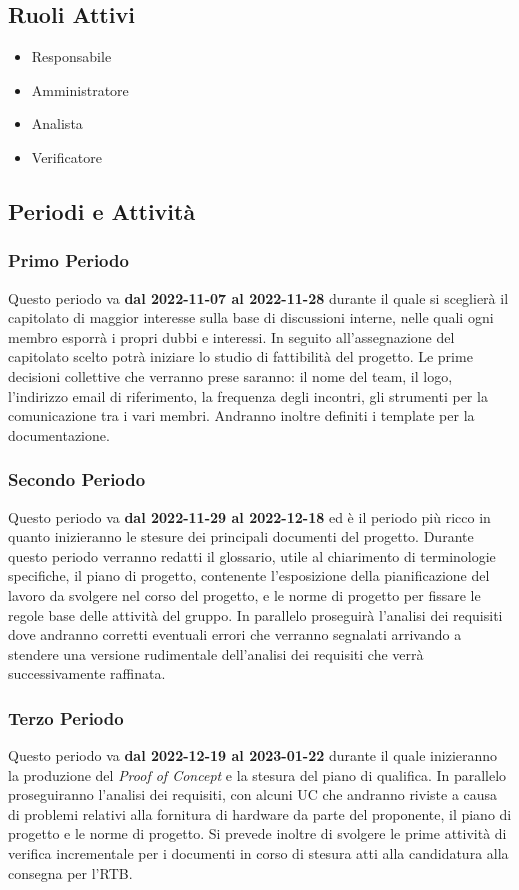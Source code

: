 \subsection{Ruoli Attivi}
\begin{itemize}
    \item Responsabile
    \item Amministratore
    \item Analista
    \item Verificatore
\end{itemize}

\subsection{Periodi e Attività}

\subsubsection{Primo Periodo}
Questo periodo va \textbf{dal 2022-11-07 al 2022-11-28} durante il quale si sceglierà il capitolato di maggior interesse sulla base di discussioni interne, nelle quali ogni membro esporrà i propri dubbi e interessi. In seguito all'assegnazione del capitolato scelto potrà iniziare lo studio di fattibilità del progetto. 
Le prime decisioni collettive che verranno prese saranno: il nome del team, il logo, l’indirizzo email di riferimento, la frequenza degli incontri, gli strumenti per la comunicazione tra i vari membri.
Andranno inoltre definiti i template per la documentazione.

\subsubsection{Secondo Periodo}
Questo periodo va \textbf{dal 2022-11-29 al 2022-12-18} ed è il periodo più ricco in quanto inizieranno le stesure dei principali documenti del progetto. Durante questo periodo verranno redatti il glossario, utile al chiarimento di terminologie specifiche, il piano di progetto, contenente l’esposizione della pianificazione del lavoro da svolgere nel corso del progetto, e le norme di progetto per fissare le regole base delle attività del gruppo. 
In parallelo proseguirà l'analisi dei requisiti dove andranno corretti eventuali errori che verranno segnalati arrivando a stendere una versione rudimentale dell'analisi dei requisiti che verrà successivamente raffinata.

\subsubsection{Terzo Periodo}
Questo periodo va \textbf{dal 2022-12-19 al 2023-01-22} durante il quale inizieranno la produzione del {\it{Proof of Concept}} e la stesura del piano di qualifica. In parallelo proseguiranno l'analisi dei requisiti, con alcuni UC che andranno riviste a causa di problemi relativi alla fornitura di hardware da parte del proponente, il piano di progetto e le norme di progetto.
Si prevede inoltre di svolgere le prime attività di verifica incrementale per i documenti in corso di stesura atti alla candidatura alla consegna per l'RTB.

